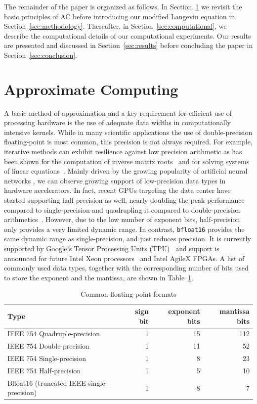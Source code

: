 \documentclass[format=acmsmall,authorversion,nonacm,timestamp,urlbreakonhyphens]{acmart}
\begin{document}
The remainder of the paper is organized as follows. In Section~\ref{sec:ac} we revisit the basic principles of AC before introducing our modified Langevin equation in Section~\ref{sec:methodology}. Thereafter, in Section~\ref{sec:computational}, we describe the computational details of our computational experiments. Our results are presented and discussed in Section~\ref{sec:results} before concluding the paper in Section~\ref{sec:conclusion}.

\section{Approximate Computing}
\label{sec:ac}

A basic method of approximation and a key requirement for efficient use of processing hardware is the use of adequate data widths in computationally intensive kernels. While in many scientific applications the use of double-precision floating-point is most common, this precision is not always required.
For example, iterative methods can exhibit resilience against low precision arithmetic as has been shown for the computation of inverse matrix roots~\cite{lass17-esl} and for solving systems of linear equations~\cite{KlavikMalossiBekasEtAl2014,Bekas,Dongarra2017,Dongarra2018}.
Mainly driven by the growing popularity of artificial neural networks \cite{Gupta2015}, we can observe growing support of low-precision data types
in hardware accelerators.
%
In fact, recent GPUs targeting the data center have started supporting half-precision as well, nearly doubling the peak performance compared to single-precision and quadrupling it compared to double-precision arithmetics~\cite{tesla}. However, due to the low number of exponent bits, half-precision only provides a very limited dynamic range. In contrast, \texttt{bfloat16} provides the same dynamic range as single-precision, and just reduces precision. It is currently supported by Google's Tensor Processing Units (TPU)~\cite{tpu} and support is announced for future Intel Xeon processors~\cite{xeon} and Intel AgileX FPGAs. A list of commonly used data types, together with the corresponding number of bits used to store the exponent and the mantissa, are shown in Table~\ref{tab:float}.
\begin{table}
  \caption{Common floating-point formats}
  \label{tab:float}
  \begin{tabular}{lrrr}
    Type & sign bit & exponent bits & mantissa bits \\
    \hline
    IEEE 754 Quadruple-precision & 1 & 15 & 112 \\
    IEEE 754 Double-precision & 1 & 11 & 52 \\
    IEEE 754 Single-precision & 1 & 8 & 23 \\
    IEEE 754 Half-precision & 1 & 5 & 10 \\
    Bfloat16 (truncated IEEE single-precision) & 1 & 8 & 7
  \end{tabular}
\end{table}
\end{document}
